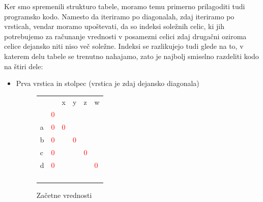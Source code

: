 \documentclass[a4paper,12pt,openright]{book}
\begin{document}
Ker smo spremenili strukturo tabele, moramo temu primerno prilagoditi tudi programsko kodo. Namesto da iteriramo po diagonalah, zdaj iteriramo po vrsticah, vendar moramo upoštevati, da so indeksi soležnih celic, ki jih potrebujemo za računanje vrednosti v posamezni celici zdaj drugačni oziroma celice dejansko niti niso več soležne. Indeksi se razlikujejo tudi glede na to, v katerem delu tabele se trenutno nahajamo, zato je najbolj smiselno razdeliti kodo na štiri dele:
\begin{itemize}
    \item Prva vrstica in stolpec (vrstica je zdaj dejansko diagonala)
    
        \begin{figure}[htb]
        \begin{center}
\begin{tabular}{|l|l|l|l|l|l|}
\cline{3-6}
  \multicolumn{2}{c|}{}  & x & y & z & w\\ \cline{2-6}
 \multicolumn{1}{c|}{} & \cellcolor{blue!15}\textcolor{red}{0} & \multicolumn{4}{c}{} \\ \cline{1-3}
a  & \cellcolor{blue!15}\textcolor{red}{0} & \cellcolor{blue!15}\textcolor{red}{0} &  \multicolumn{3}{c}{} \\ \cline{1-4}
b  & \cellcolor{blue!15}\textcolor{red}{0} & \textcolor{blue}{} & \cellcolor{blue!15}\textcolor{red}{0} & \multicolumn{2}{c}{}  \\ \cline{1-5}
c  & \cellcolor{blue!15}\textcolor{red}{0} & \textcolor{purple}{} & \textcolor{blue}{} & \cellcolor{blue!15}\textcolor{red}{0} & \multicolumn{1}{c}{} \\ \cline{1-6}
d  & \cellcolor{blue!15}\textcolor{red}{0} & \textcolor{brown}{} & \textcolor{purple}{} & \textcolor{blue}{} & \cellcolor{blue!15}\textcolor{red}{0} \\ \hline
 \multicolumn{1}{c|}{} &  & \textcolor{brown}{} & \textcolor{purple}{} & \textcolor{blue}{} & \multicolumn{1}{c}{}  \\ \cline{2-5}
\multicolumn{1}{c|}{}  &  & \textcolor{brown}{} & \textcolor{purple}{} & \multicolumn{2}{c}{}   \\ \cline{2-4}
\multicolumn{1}{c|}{}  &  & \textcolor{brown}{} &  \multicolumn{3}{c}{}   \\ \cline{2-3}
\multicolumn{1}{c|}{}  &  & \multicolumn{4}{c}{}  \\ \cline{2-2}
\end{tabular}
        \end{center}
        \caption{Začetne vrednosti}
        \label{diagMemory1}
        \end{figure}


\end{itemize}
\end{document}
